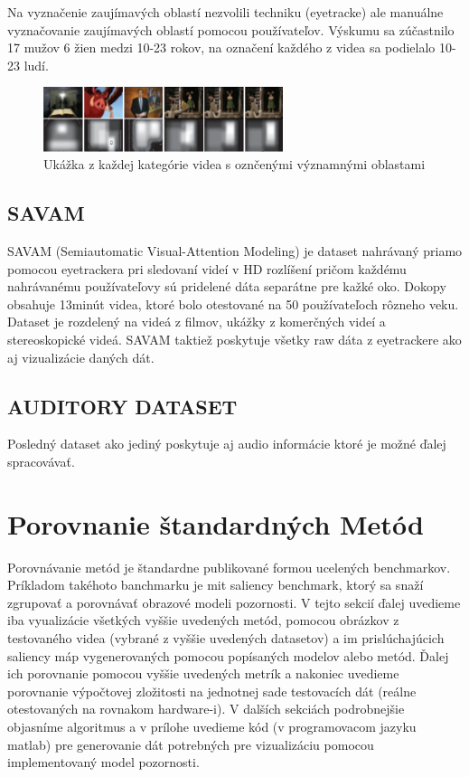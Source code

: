 Na vyznačenie zaujímavých oblastí nezvolili techniku (eyetracke) ale manuálne vyznačovanie zaujímavých oblastí pomocou používateľov. Výskumu sa zúčastnilo 17 mužov 6 žien medzi 10-23 rokov, na označení každého z videa sa podielalo 10-23 ludí.

\begin{figure}[H]
 \centering
 \includegraphics[width=7cm]{pics/rsd.png}
 \caption{Ukážka z každej kategórie videa s oznčenými významnými oblastami}
\end{figure}
\vspace{10mm}

\subsection{SAVAM}
SAVAM (Semiautomatic Visual-Attention Modeling) je dataset nahrávaný priamo pomocou eyetrackera pri sledovaní videí v HD rozlíšení pričom každému nahrávanému používateľovy sú pridelené dáta separátne pre kažké oko. Dokopy obsahuje 13minút videa, ktoré bolo otestované na 50 používateľoch rôzneho veku. Dataset je rozdelený na videá z filmov, ukážky z komerčných videí a stereoskopické videá. SAVAM taktiež poskytuje všetky raw dáta z eyetrackere ako aj vizualizácie daných dát\cite{savam}.

\subsection{AUDITORY DATASET}
Posledný dataset ako jediný poskytuje aj audio informácie ktoré je možné ďalej spracovávať.


\section{Porovnanie štandardných Metód}
Porovnávanie metód je štandardne publikované formou ucelených benchmarkov. Príkladom takéhoto banchmarku je mit saliency benchmark\cite{mit-saliency-benchmark}, ktorý sa snaží zgrupovať a porovnávať obrazové modeli pozornosti. V tejto sekcií ďalej uvedieme iba vyualizácie všetkých vyššie uvedených metód, pomocou obrázkov z testovaného videa (vybrané z vyššie uvedených datasetov) a im prislúchajúcich saliency máp vygenerovaných pomocou popísaných modelov alebo metód. Ďalej ich porovnanie pomocou vyššie uvedených metrík a nakoniec uvedieme porovnanie výpočtovej zložitosti na jednotnej sade testovacích dát (reálne otestovaných na rovnakom hardware-i). V dalších sekciách podrobnejšie objasníme algoritmus a v prílohe uvedieme kód (v programovacom jazyku matlab) pre generovanie dát potrebných pre vizualizáciu pomocou implementovaný model pozornosti.
